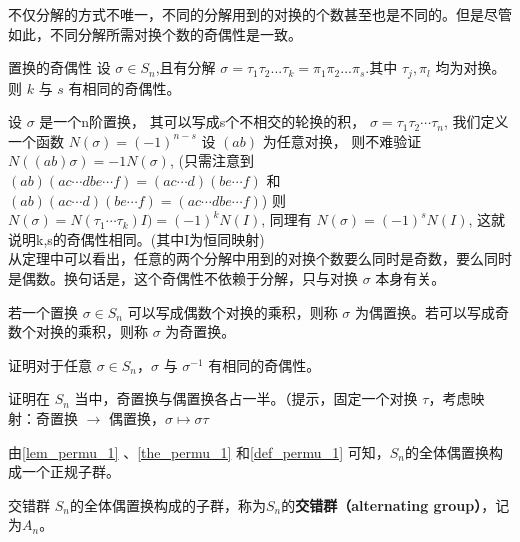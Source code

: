 不仅分解的方式不唯一，不同的分解用到的对换的个数甚至也是不同的。但是尽管如此，不同分解所需对换个数的奇偶性是一致。

\begin{theorem}{置换的奇偶性}\label{the_permu_1}
设 $\sigma\in S_n$,且有分解 $\sigma=\tau_1\tau_2...\tau_k=\pi_1\pi_2...\pi_s$.其中 $\tau_j, \pi_l$ 均为对换。则 $k$ 与 $s$ 有相同的奇偶性。
\end{theorem}
设 $\sigma$ 是一个n阶置换， 其可以写成s个不相交的轮换的积， $\sigma=\tau_1\tau_2\cdots\tau_n$, 我们定义一个函数 $N(\sigma)=(-1)^{n-s}$
            设 $(ab)$ 为任意对换， 则不难验证 $N((ab)\sigma)=-1N(\sigma)$, (只需注意到 $(ab)(ac\cdots dbe\cdots f)=(a c \cdots d)(b e \cdots f)$ 和 $(ab)(a c \cdots d)(b e \cdots f)=(ac\cdots dbe\cdots f)$)
            则 $N(\sigma)=N(\tau_1\cdots \tau_k)I)=(-1)^kN(I)$, 同理有 $N(\sigma)=(-1)^sN(I)$, 这就说明k,s的奇偶性相同。(其中I为恒同映射)
            \\从定理中可以看出，任意的两个分解中用到的对换个数要么同时是奇数，要么同时是偶数。换句话是，这个奇偶性不依赖于分解，只与对换 $\sigma$ 本身有关。

\begin{definition}{}\label{def_permu_1}
若一个置换 $\sigma\in S_n$ 可以写成偶数个对换的乘积，则称 $\sigma$ 为偶置换。若可以写成奇数个对换的乘积，则称 $\sigma$ 为奇置换。
\end{definition}

\begin{exercise}{}
证明对于任意 $\sigma\in S_n$，$\sigma$ 与 $\sigma^{-1}$ 有相同的奇偶性。
\end{exercise}

\begin{exercise}{}
证明在 $S_n$ 当中，奇置换与偶置换各占一半。（提示，固定一个对换 $\tau$，考虑映射：奇置换 $\to$ 偶置换，$\sigma\mapsto\sigma\tau$
\end{exercise}


由\autoref{lem_permu_1} 、\autoref{the_permu_1} 和\autoref{def_permu_1} 可知，$S_n$的全体偶置换构成一个正规子群。

\begin{definition}{交错群}\label{def_permu_2}
$S_n$的全体偶置换构成的子群，称为$S_n$的\textbf{交错群（alternating group）}，记为$A_n$。
\end{definition}













